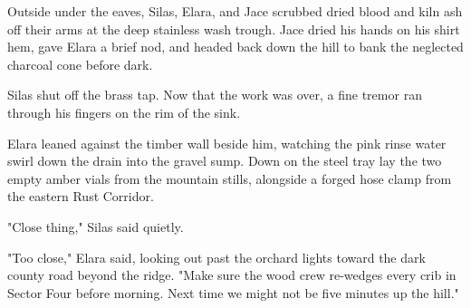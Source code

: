 Outside under the eaves, Silas, Elara, and Jace scrubbed dried blood and kiln ash off their arms at the deep stainless wash trough. Jace dried his hands on his shirt hem, gave Elara a brief nod, and headed back down the hill to bank the neglected charcoal cone before dark.

Silas shut off the brass tap. Now that the work was over, a fine tremor ran through his fingers on the rim of the sink.

Elara leaned against the timber wall beside him, watching the pink rinse water swirl down the drain into the gravel sump. Down on the steel tray lay the two empty amber vials from the mountain stills, alongside a forged hose clamp from the eastern Rust Corridor.

"Close thing," Silas said quietly.

"Too close," Elara said, looking out past the orchard lights toward the dark county road beyond the ridge. "Make sure the wood crew re-wedges every crib in Sector Four before morning. Next time we might not be five minutes up the hill."

